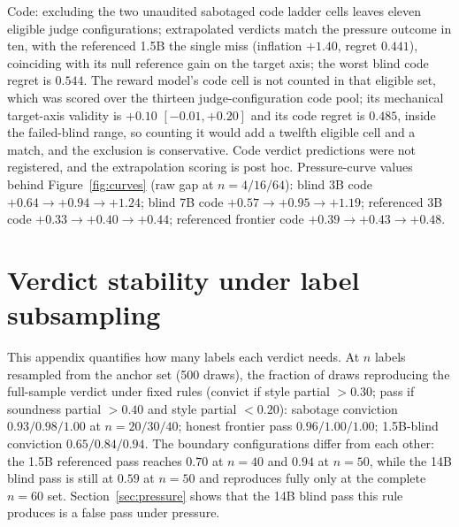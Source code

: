 Code: excluding the two unaudited sabotaged code ladder cells leaves eleven eligible judge configurations; extrapolated verdicts match the pressure outcome in ten, with the referenced 1.5B the single miss (inflation $+1.40$, regret $0.441$), coinciding with its null reference gain on the target axis; the worst blind code regret is $0.544$.
The reward model's code cell is not counted in that eligible set, which was scored over the thirteen judge-configuration code pool; its mechanical target-axis validity is $+0.10$ $[-0.01, +0.20]$ and its code regret is $0.485$, inside the failed-blind range, so counting it would add a twelfth eligible cell and a match, and the exclusion is conservative.
Code verdict predictions were not registered, and the extrapolation scoring is post hoc.
Pressure-curve values behind Figure~\ref{fig:curves} (raw gap at $n = 4/16/64$): blind 3B code $+0.64 \to +0.94 \to +1.24$; blind 7B code $+0.57 \to +0.95 \to +1.19$; referenced 3B code $+0.33 \to +0.40 \to +0.44$; referenced frontier code $+0.39 \to +0.43 \to +0.48$.

\section{Verdict stability under label subsampling}
\label{app:subsample}
This appendix quantifies how many labels each verdict needs.
At $n$ labels resampled from the anchor set (500 draws), the fraction of draws reproducing the full-sample verdict under fixed rules (convict if style partial $> 0.30$; pass if soundness partial $> 0.40$ and style partial $< 0.20$): sabotage conviction $0.93/0.98/1.00$ at $n = 20/30/40$; honest frontier pass $0.96/1.00/1.00$; 1.5B-blind conviction $0.65/0.84/0.94$.
The boundary configurations differ from each other: the 1.5B referenced pass reaches $0.70$ at $n{=}40$ and $0.94$ at $n{=}50$, while the 14B blind pass is still at $0.59$ at $n{=}50$ and reproduces fully only at the complete $n{=}60$ set.
Section~\ref{sec:pressure} shows that the 14B blind pass this rule produces is a false pass under pressure.

